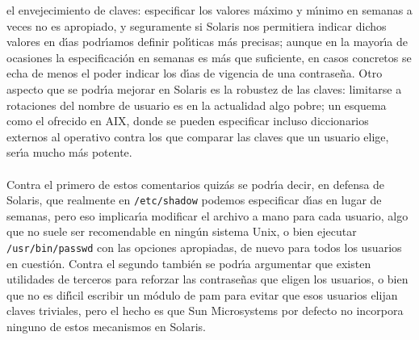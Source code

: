 el envejecimiento de claves: especificar los valores m\'aximo y m\'{\i}nimo en
semanas a veces no es apropiado, y seguramente si Solaris nos permitiera indicar
dichos valores en d\'{\i}as podr\'{\i}amos definir pol\'{\i}ticas m\'as 
precisas; aunque en la mayor\'{\i}a de ocasiones la especificaci\'on en semanas
es m\'as que suficiente, en casos concretos se echa de menos el poder indicar 
los d\'{\i}as de vigencia de una contrase\~na. Otro aspecto que se podr\'{\i}a
mejorar en Solaris es la robustez de las claves: limitarse a rotaciones del
nombre de usuario es en la actualidad algo pobre; un esquema como el ofrecido en
AIX, donde se pueden especificar incluso diccionarios externos al operativo 
contra los que comparar las claves que un usuario elige, ser\'{\i}a mucho m\'as
potente.\\
\\Contra el primero de estos comentarios quiz\'as se podr\'{\i}a decir, en 
defensa de Solaris, que realmente en {\tt /etc/shadow} podemos especificar 
d\'{\i}as en lugar de semanas, pero eso implicar\'{\i}a modificar el archivo
a mano para cada usuario, algo que no suele ser recomendable en ning\'un
sistema Unix, o bien ejecutar {\tt /usr/bin/passwd} con las opciones
apropiadas, de nuevo para todos los usuarios en cuesti\'on. Contra el segundo
tambi\'en se podr\'{\i}a argumentar que existen utilidades de terceros para 
reforzar las contrase\~nas que eligen los usuarios, o bien que no es 
dif\'{\i}cil escribir un m\'odulo de {\sc pam} para evitar que esos usuarios
elijan claves triviales, pero el hecho es que Sun Microsystems por defecto no 
incorpora ninguno de estos mecanismos en Solaris.
